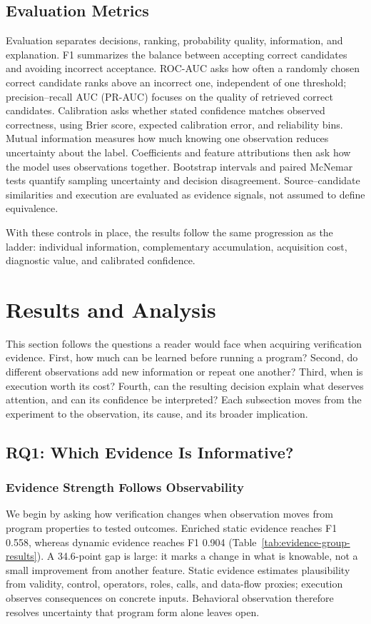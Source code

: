 ﻿\documentclass[conference]{IEEEtran}
\begin{document}
\subsection{Evaluation Metrics}
Evaluation separates decisions, ranking, probability quality, information, and explanation. F1 summarizes the balance between accepting correct candidates and avoiding incorrect acceptance. ROC-AUC asks how often a randomly chosen correct candidate ranks above an incorrect one, independent of one threshold; precision--recall AUC (PR-AUC) focuses on the quality of retrieved correct candidates. Calibration asks whether stated confidence matches observed correctness, using Brier score, expected calibration error, and reliability bins. Mutual information measures how much knowing one observation reduces uncertainty about the label. Coefficients and feature attributions then ask how the model uses observations together. Bootstrap intervals and paired McNemar tests quantify sampling uncertainty and decision disagreement. Source--candidate similarities and execution are evaluated as evidence signals, not assumed to define equivalence.

With these controls in place, the results follow the same progression as the ladder: individual information, complementary accumulation, acquisition cost, diagnostic value, and calibrated confidence.

\section{Results and Analysis}
This section follows the questions a reader would face when acquiring verification evidence. First, how much can be learned before running a program? Second, do different observations add new information or repeat one another? Third, when is execution worth its cost? Fourth, can the resulting decision explain what deserves attention, and can its confidence be interpreted? Each subsection moves from the experiment to the observation, its cause, and its broader implication.

\subsection{RQ1: Which Evidence Is Informative?}
\subsubsection{Evidence Strength Follows Observability}
We begin by asking how verification changes when observation moves from program properties to tested outcomes. Enriched static evidence reaches F1 0.558, whereas dynamic evidence reaches F1 0.904 (Table~\ref{tab:evidence-group-results}). A 34.6-point gap is large: it marks a change in what is knowable, not a small improvement from another feature. Static evidence estimates plausibility from validity, control, operators, roles, calls, and data-flow proxies; execution observes consequences on concrete inputs. Behavioral observation therefore resolves uncertainty that program form alone leaves open.
\end{document}
